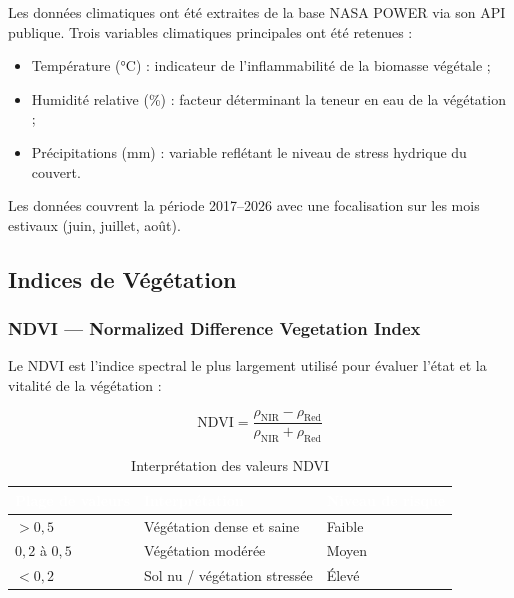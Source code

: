 \documentclass[12pt,a4paper]{report}
\begin{document}
Les données climatiques ont été extraites de la base NASA POWER via son API publique. Trois variables climatiques principales ont été retenues :
\begin{itemize}
  \item Température (°C) : indicateur de l'inflammabilité de la biomasse végétale ;
  \item Humidité relative (\%) : facteur déterminant la teneur en eau de la végétation ;
  \item Précipitations (mm) : variable reflétant le niveau de stress hydrique du couvert.
\end{itemize}

Les données couvrent la période 2017--2026 avec une focalisation sur les mois estivaux (juin, juillet, août).

\subsection{Indices de Végétation}

\subsubsection{NDVI --- Normalized Difference Vegetation Index}

Le NDVI est l'indice spectral le plus largement utilisé pour évaluer l'état et la vitalité de la végétation :

\begin{equation}
\text{NDVI} = \frac{\rho_{\text{NIR}} - \rho_{\text{Red}}}{\rho_{\text{NIR}} + \rho_{\text{Red}}}
\label{eq:ndvi}
\end{equation}

\begin{table}[H]
\centering
{}
\begin{tabular}{L{3cm} L{5cm} L{3cm}}
\toprule
{}
\textcolor{white}{\textbf{Plage de valeurs}} &
\textcolor{white}{\textbf{Interprétation}} &
\textcolor{white}{\textbf{Niveau de risque}} \\
\midrule
$> 0{,}5$       & Végétation dense et saine       & Faible \\
$0{,}2$ à $0{,}5$ & Végétation modérée              & Moyen  \\
$< 0{,}2$       & Sol nu / végétation stressée    & Élevé  \\
\bottomrule
\end{tabular}
\caption{Interprétation des valeurs NDVI}
\label{tab:ndvi}
\end{table}
\end{document}
